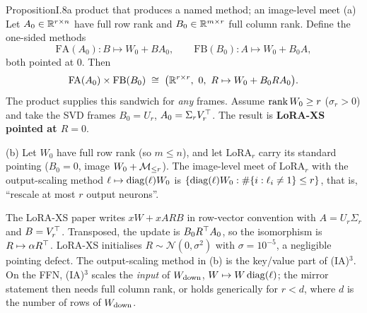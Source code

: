\begin{restate}{Proposition}{I.8}{a product that produces a named method; an image-level meet}
(a) Let $A_0\in\mathbb{R}^{r\times n}$ have full row rank and $B_0\in\mathbb{R}^{m\times r}$ full column rank. Define the one-sided methods
\begin{equation*}
  \mathrm{FA}(A_0):B\mapsto W_0+BA_0,\qquad \mathrm{FB}(B_0):A\mapsto W_0+B_0A,
\end{equation*}
both pointed at $0$. Then
\begin{equation*}
  \mathrm{FA}(A_0)\times\mathrm{FB}(B_0)\;\cong\;\big(\mathbb{R}^{r\times r},\ 0,\ R\mapsto W_0+B_0RA_0\big).
\end{equation*}
The product supplies this sandwich for \emph{any} frames. Assume $\operatorname{rank} W_0\ge r$ ($\sigma_r>0$) and take the SVD frames
$B_0=U_r$, $A_0=\Sigma_rV_r^{\top}$. The result is \textbf{LoRA-XS pointed at $R=0$}.

(b) Let $W_0$ have full row rank (so $m\le n$), and let $\mathrm{LoRA}_r$ carry its standard pointing ($B_0=0$, image
$W_0+\mathcal{M}_{\le r}$). The image-level meet of $\mathrm{LoRA}_r$ with the output-scaling method $\ell\mapsto\operatorname{diag}(\ell)W_0$ is
$\{\operatorname{diag}(\ell)W_0:\#\{i:\ell_i\neq1\}\le r\}$, that is, ``rescale at most $r$ output neurons''.

\upshape The LoRA-XS paper writes $xW+xARB$ in row-vector convention with $A=U_r\Sigma_r$ and $B=V_r^{\top}$. Transposed, the
update is $B_0R^{\top} A_0$, so the isomorphism is $R\mapsto\alpha R^{\top}$. LoRA-XS initialises $R\sim\mathcal N(0,\sigma^2)$
with $\sigma=10^{-5}$, a negligible pointing defect. The output-scaling method in (b) is the key/value part of (IA)$^3$.
On the FFN, (IA)$^3$ scales the \emph{input} of $W_{\rm down}$, $W\mapsto W\operatorname{diag}(\ell)$; the mirror statement then needs
full column rank, or holds generically for $r<d$, where $d$ is the number of rows of $W_{\rm down}$.
\end{restate}


